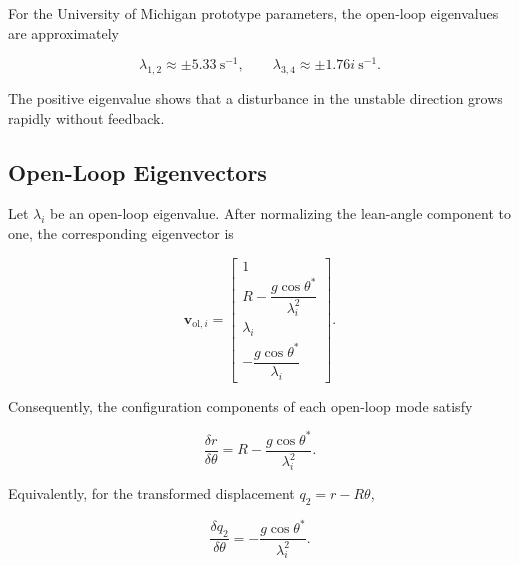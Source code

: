 For the University of Michigan prototype parameters, the open-loop eigenvalues are approximately

\begin{equation}
\lambda_{1,2}
\approx
\pm5.33~\mathrm{s}^{-1},
\qquad
\lambda_{3,4}
\approx
\pm1.76i~\mathrm{s}^{-1}.
\label{eq:numerical-open-loop-eigenvalues}
\end{equation}

The positive eigenvalue shows that a disturbance in the unstable direction grows rapidly without feedback.

%

\subsection{Open-Loop Eigenvectors}

Let $\lambda_i$ be an open-loop eigenvalue. After normalizing the lean-angle component to one, the corresponding eigenvector is

\begin{equation}
\mathbf{v}_{\mathrm{ol},i}
=
\begin{bmatrix}
1 \\[2mm]
R-\dfrac{g\cos\theta^{*}}{\lambda_i^2}
\\[3mm]
\lambda_i
\\[2mm]
-\dfrac{g\cos\theta^{*}}{\lambda_i}
\end{bmatrix}.
\label{eq:open-loop-eigenvector}
\end{equation}

Consequently, the configuration components of each open-loop mode satisfy

\begin{equation}
\frac{\delta r}{\delta\theta}
=
R-
\frac{
g\cos\theta^{*}
}
{\lambda_i^2}.
\label{eq:open-loop-modal-direction}
\end{equation}

Equivalently, for the transformed displacement $q_2=r-R\theta$,

\begin{equation}
\frac{\delta q_2}{\delta\theta}
=
-\frac{
g\cos\theta^{*}
}
{\lambda_i^2}.
\label{eq:open-loop-q2-direction}
\end{equation}

